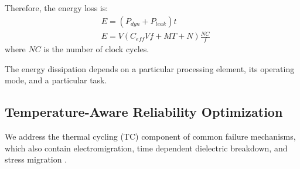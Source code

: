 Therefore, the energy loss is:
\begin{align*}
  & E = (P_{dyn} + P_{leak}) t \\
  & E = V (C_{eff} V f + MT + N) \frac{NC}{f}
\end{align*}
where $NC$ is the number of clock cycles.

The energy dissipation depends on a particular processing element, its operating mode, and a particular task.

\subsection{Temperature-Aware Reliability Optimization}
We address the thermal cycling (TC) component of common failure mechanisms, which also contain electromigration, time dependent dielectric breakdown, and stress migration \cite{xiang2010}.
